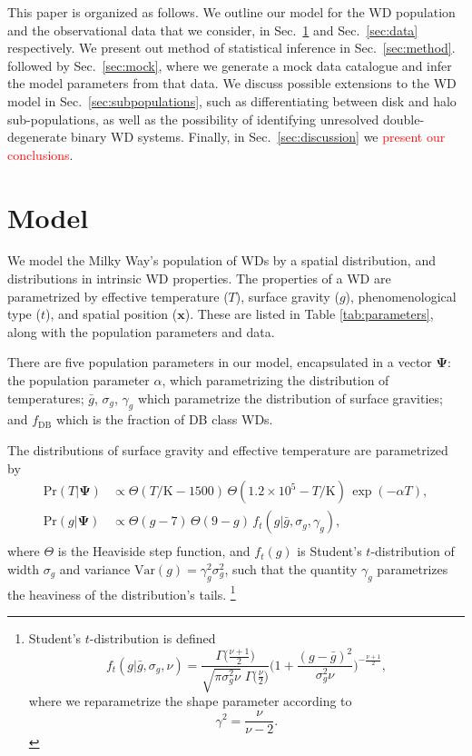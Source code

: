 \documentclass[fleqn,usenatbib]{mnras}
\newcommand{\changes}[1]{\textcolor{red}{#1}}
\newcommand{\popp}{\boldsymbol{\Psi}}
\newcommand{\Teff}{T}
\newcommand{\logg}{g}
\newcommand{\pr}{\text{Pr}}
\newcommand{\K}{\text{K}}
\begin{document}
This paper is organized as follows. We outline our model for the WD population and the observational data that we consider, in Sec.~\ref{sec:model} and Sec.~\ref{sec:data} respectively. We present out method of statistical inference in Sec.~\ref{sec:method}.  followed by Sec.~\ref{sec:mock}, where we generate a mock data catalogue and infer the model parameters from that data. We discuss possible extensions to the WD model in Sec.~\ref{sec:subpopulations}, such as differentiating between disk and halo sub-populations, as well as the possibility of identifying unresolved double-degenerate binary WD systems. Finally, in Sec.~\ref{sec:discussion} we \changes{present our conclusions}.





\section{Model}\label{sec:model}

We model the Milky Way's population of WDs by a spatial distribution, and distributions in intrinsic WD properties. The properties of a WD are parametrized by effective temperature ($\Teff$), surface gravity ($\logg$), phenomenological type ($t$), and spatial position ($\mathbf{x}$). These are listed in Table \ref{tab:parameters}, along with the population parameters and data.

There are five population parameters in our model, encapsulated in a vector $\popp$: the population parameter $\alpha$, which parametrizing the distribution of temperatures; $\bar{g}$, $\sigma_g$, $\gamma_g$ which parametrize the distribution of surface gravities; and $f_\text{DB}$ which is the fraction of DB class WDs.

The distributions of surface gravity and effective temperature are parametrized by
\begin{equation}\label{eq:T&g}
\begin{split}
    \pr(\Teff | \popp) & \propto \Theta(\Teff/\K - 1500)\, \Theta(1.2\times10^5 - \Teff/\K) \, \exp (-\alpha \Teff),\\
	\pr(\logg | \popp) & \propto \Theta(\logg - 7) \, \Theta(9- \logg) \, f_t(\logg|\bar{g},\sigma_g,\gamma_g),\\
\end{split}
\end{equation}
where $\Theta$ is the Heaviside step function, and $f_t(\logg)$ is Student's $t$-distribution of width $\sigma_g$ and variance $\text{Var}(g) = \gamma_g^2 \sigma_g^2$, such that the quantity $\gamma_g$ parametrizes the heaviness of the distribution's tails.
\footnote{
Student's $t$-distribution is defined
\begin{equation}
	f_t(\logg|\bar{g},\sigma_g,\nu) =
	\frac{\Gamma\big( \frac{\nu+1}{2} \big)}{\sqrt{\pi\sigma_g^2\nu}\;\Gamma\big( \frac{\nu}{2} \big)}
	\Bigg( 1+\frac{(\logg-\bar{g})^2}{\sigma_g^2\nu} \Bigg)^{-\frac{\nu+1}{2}},
\end{equation}
where we reparametrize the shape parameter according to
\begin{equation}
	\gamma^2 = \frac{\nu}{\nu-2}.
\end{equation}
}
\end{document}

